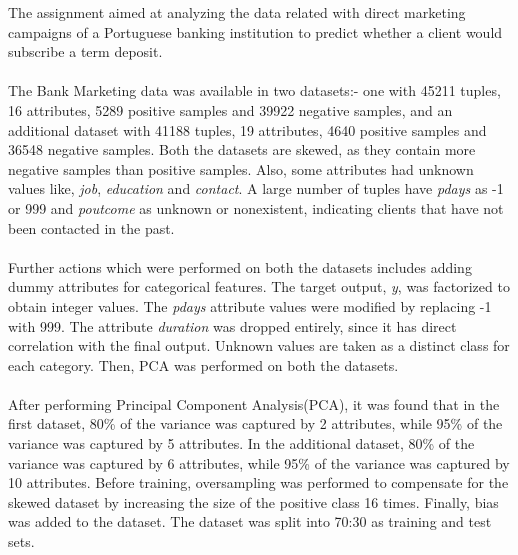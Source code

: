 \documentclass[twocolumn]{article}
\begin{document}
\twocolumn[
	\begin{@twocolumnfalse}
	\maketitle
    \vspace{0.5cm}
    \end{@twocolumnfalse}
]

The assignment aimed at analyzing the data related with direct marketing campaigns of a Portuguese banking institution to predict whether a client would subscribe a term deposit.

\paragraph{}
The Bank Marketing data was available in two datasets:- one with 45211 tuples, 16 attributes, 5289 positive samples and 39922 negative samples, and an additional dataset with 41188 tuples, 19 attributes, 4640 positive samples and 36548 negative samples. Both the datasets are skewed, as they contain more negative samples than positive samples. Also, some attributes had unknown values like, \textit{job}, \textit{education} and \textit{contact}. A large number of tuples have \textit{pdays} as -1 or 999 and \textit{poutcome} as unknown or nonexistent, indicating clients that have not been contacted in the past.

\paragraph{}
Further actions which were performed on both the datasets includes adding dummy attributes for categorical features. The target output, \textit{y}, was factorized to obtain integer values. The \textit{pdays} attribute values were modified by replacing -1 with 999. The attribute \textit{duration} was dropped entirely, since it has direct correlation with the final output. Unknown values are taken as a distinct class for each category. Then, PCA was performed on both the datasets.

\paragraph{}
After performing Principal Component Analysis(PCA), it was found that in the first dataset, 80\% of the variance was captured by 2 attributes, while 95\% of the variance was captured by 5 attributes. In the additional dataset, 80\% of the variance was captured by 6 attributes, while 95\% of the variance was captured by 10 attributes. Before training, oversampling was performed to compensate for the skewed dataset by increasing the size of the positive class 16 times. Finally, bias was added to the dataset. The dataset was split into 70:30 as training and test sets.
\end{document}
